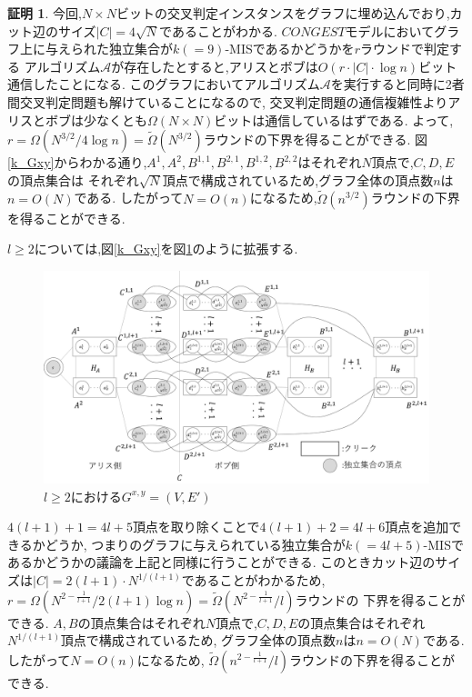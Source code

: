 \documentclass[12pt]{thesis}
\theoremstyle{definition}
\newtheorem*{prf*}{証明}
\begin{document}
\begin{prf*}
今回,$N \times N$ビットの交叉判定インスタンスをグラフに埋め込んでおり,カット辺のサイズ$|C| = 4 \sqrt{N}$であることがわかる.
$CONGEST$モデルにおいてグラフ上に与えられた独立集合が$k( = 9)$-MISであるかどうかを$r$ラウンドで判定する
アルゴリズム$\mathcal{A}$が存在したとすると,アリスとボブは$O(r \cdot |C| \cdot \log n)$ビット通信したことになる.
このグラフにおいてアルゴリズム$\mathcal{A}$を実行すると同時に2者間交叉判定問題も解けていることになるので,
交叉判定問題の通信複雑性よりアリスとボブは少なくとも$\Omega (N \times N)$ビットは通信しているはずである.
よって,$r = \Omega \left(N^{3/2} / 4\log n\right) = \tilde{\Omega}\left(N^{3/2}\right)$ラウンドの下界を得ることができる.
図\ref{k_Gxy}からわかる通り,$A^{1}, A^{2}, B^{1,1}, B^{2,1}, B^{1,2}, B^{2,2}$はそれぞれ$N$頂点で,$C, D, E$の頂点集合は
それぞれ$\sqrt{N}$頂点で構成されているため,グラフ全体の頂点数$n$は$n = O(N)$である.
したがって$N = O(n)$になるため,$\tilde{\Omega}\left(n^{3/2}\right)$ラウンドの下界を得ることができる. 

$l \geq 2$については,図\ref{k_Gxy}を図\ref{k_Gxyl}のように拡張する.

\begin{figure}[ht]
\begin{center}
\includegraphics[width=120mm]{k_Gxyl.png}
\end{center}
\caption{$l \geq 2$における$G^{x, y} = (V, E')$}
\label{k_Gxyl}
\end{figure}

$4(l + 1) + 1 = 4l + 5$頂点を取り除くことで$4(l + 1) + 2 = 4l + 6$頂点を追加できるかどうか, 
つまりのグラフに与えられている独立集合が$k( = 4l + 5)$-MISであるかどうかの議論を上記と同様に行うことができる.
このときカット辺のサイズは$|C| = 2(l + 1) \cdot N^{1/(l + 1)}$であることがわかるため,
$r = \Omega \left(N^{2 - \frac{1}{l + 1}} / 2( l + 1)\log n\right) = \tilde{\Omega}\left(N^{2 - \frac{1}{l + 1}}/l\right)$ラウンドの
下界を得ることができる.
$A, B$の頂点集合はそれぞれ$N$頂点で,$C, D, E$の頂点集合はそれぞれ$N^{1/(l + 1)}$頂点で構成されているため,
グラフ全体の頂点数$n$は$n = O(N)$である.したがって$N = O(n)$になるため,
$\tilde{\Omega}\left(n^{2 - \frac{1}{l + 1}}/l\right)$ラウンドの下界を得ることができる. 
\end{prf*}
\newpage
\end{document}
